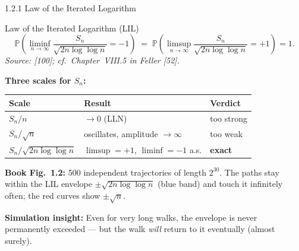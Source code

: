 \documentclass[aspectratio=169,10pt]{beamer}
\begin{document}
\begin{frame}[allowframebreaks]{1.2.1 Law of the Iterated Logarithm}

  \begin{block}{Law of the Iterated Logarithm (LIL)}
    \[
      \mathbb{P}\!\left(
        \liminf_{n \to \infty} \frac{S_n}{\sqrt{2n\log\log n}} = -1
      \right)
      \;=\;
      \mathbb{P}\!\left(
        \limsup_{n \to \infty} \frac{S_n}{\sqrt{2n\log\log n}} = +1
      \right) = 1.
    \]
    \emph{Source: [100]; cf.\ Chapter~VIII.5 in Feller [52].}
  \end{block}

  \textbf{Three scales for $S_n$:}
  \begin{center}
  \begin{tabular}{lll}
    \toprule
    Scale & Result & Verdict \\
    \midrule
    $S_n / n$ & $\to 0$ (LLN) & too strong \\
    $S_n / \sqrt{n}$ & oscillates, amplitude $\to\infty$ & too weak \\
    $S_n / \sqrt{2n\log\log n}$ & $\limsup = +1$, $\liminf = -1$ a.s. & \textbf{exact} \\
    \bottomrule
  \end{tabular}
  \end{center}

  \framebreak

  \textbf{Book Fig.~1.2:} 500 independent trajectories of length $2^{30}$.
  The paths stay within the LIL envelope $\pm\sqrt{2n\log\log n}$ (blue
  band) and touch it infinitely often; the red curves show $\pm\sqrt{n}$.

  \vspace{0.5em}
  \textbf{Simulation insight:} Even for very long walks, the envelope is
  never permanently exceeded --- but the walk \emph{will} return to it
  eventually (almost surely).

\end{frame}
\end{document}
